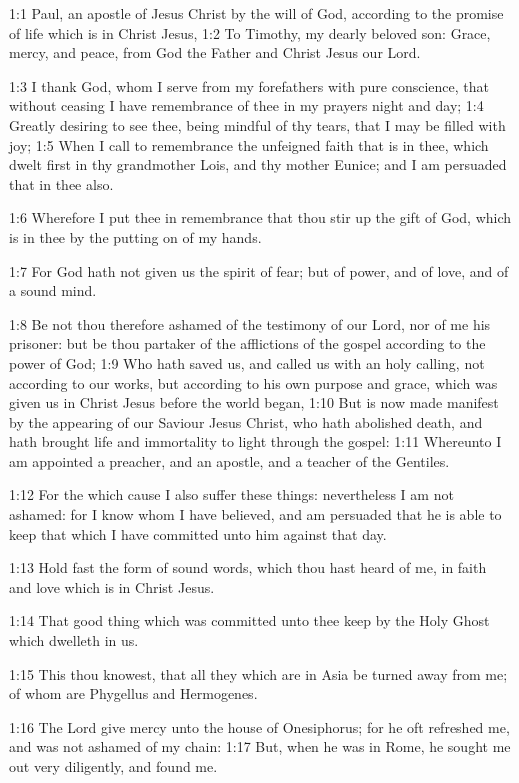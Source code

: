 

1:1 Paul, an apostle of Jesus Christ by the will of God, according to the promise of life which is in Christ Jesus, 1:2 To Timothy, my dearly beloved son: Grace, mercy, and peace, from God the Father and Christ Jesus our Lord.

1:3 I thank God, whom I serve from my forefathers with pure conscience, that without ceasing I have remembrance of thee in my prayers night and day; 1:4 Greatly desiring to see thee, being mindful of thy tears, that I may be filled with joy; 1:5 When I call to remembrance the unfeigned faith that is in thee, which dwelt first in thy grandmother Lois, and thy mother Eunice; and I am persuaded that in thee also.

1:6 Wherefore I put thee in remembrance that thou stir up the gift of God, which is in thee by the putting on of my hands.

1:7 For God hath not given us the spirit of fear; but of power, and of love, and of a sound mind.

1:8 Be not thou therefore ashamed of the testimony of our Lord, nor of me his prisoner: but be thou partaker of the afflictions of the gospel according to the power of God; 1:9 Who hath saved us, and called us with an holy calling, not according to our works, but according to his own purpose and grace, which was given us in Christ Jesus before the world began, 1:10 But is now made manifest by the appearing of our Saviour Jesus Christ, who hath abolished death, and hath brought life and immortality to light through the gospel: 1:11 Whereunto I am appointed a preacher, and an apostle, and a teacher of the Gentiles.

1:12 For the which cause I also suffer these things: nevertheless I am not ashamed: for I know whom I have believed, and am persuaded that he is able to keep that which I have committed unto him against that day.

1:13 Hold fast the form of sound words, which thou hast heard of me, in faith and love which is in Christ Jesus.

1:14 That good thing which was committed unto thee keep by the Holy Ghost which dwelleth in us.

1:15 This thou knowest, that all they which are in Asia be turned away from me; of whom are Phygellus and Hermogenes.

1:16 The Lord give mercy unto the house of Onesiphorus; for he oft refreshed me, and was not ashamed of my chain: 1:17 But, when he was in Rome, he sought me out very diligently, and found me.

